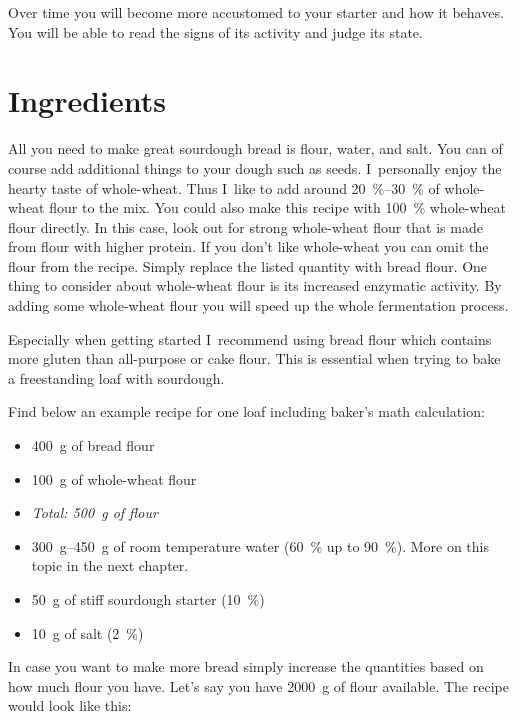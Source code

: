 Over time you will become more accustomed to your starter
and how it behaves. You will be able to read the signs of its
activity and judge its state.

\section{Ingredients}

All you need to make great sourdough bread is flour, water, and salt. You
can of course add additional things to your dough such as seeds. I~personally
enjoy the hearty taste of whole-wheat. Thus I~like to add around
\qtyrange{20}{30}{\percent} of whole-wheat flour to the mix. You could also
make this recipe with \qty{100}{\percent}
whole-wheat flour directly. In this case, look out for strong whole-wheat
flour that is made from flour with higher protein. If you don't like whole-wheat
you can omit the flour from the recipe. Simply replace the listed
quantity with bread flour. One thing to consider about whole-wheat
flour is its increased enzymatic activity. By adding some whole-wheat
flour you will speed up the whole fermentation process.

Especially when getting started I~recommend using bread flour which
contains more gluten than all-purpose or cake flour. This is essential
when trying to bake a freestanding loaf with sourdough.

Find below an example recipe for one loaf including baker's math calculation:

\begin{itemize}
  \item \qty{400}{\gram} of bread flour
  \item \qty{100}{\gram} of whole-wheat flour
  \item \emph{Total: 500~g of flour}
  \item \qtyrange{300}{450}{\gram} of room temperature water (\qty{60}{\percent} up to \qty{90}{\percent}). More on
this topic in the next chapter.
  \item \qty{50}{\gram} of stiff sourdough starter (\qty{10}{\percent})
  \item \qty{10}{\gram} of salt (\qty{2}{\percent})
\end{itemize}

In case you want to make more bread simply increase the quantities based on
how much flour you have. Let's say you have \qty{2000}{\gram} of flour available. The
recipe would look like this:


